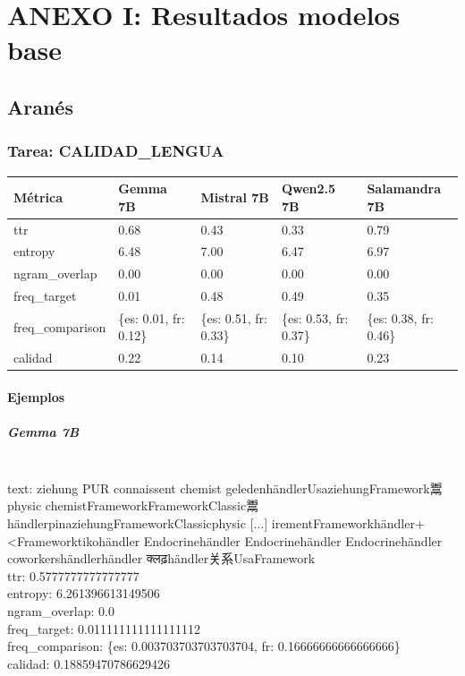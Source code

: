\chapter{ANEXO I: Resultados modelos base}

\section{Aranés}

\subsection{Tarea: CALIDAD\_LENGUA}\label{tarea-calidad_lengua}
{\def\LTcaptype{none}
\begin{longtable}[]{@{}lllll@{}}
\toprule\noalign{}
Métrica & Gemma 7B & Mistral 7B & Qwen2.5 7B & Salamandra 7B \\
\midrule\noalign{}
\endhead
\bottomrule\noalign{}
\endlastfoot
ttr & 0.68 & 0.43 & 0.33 & 0.79 \\
entropy & 6.48 & 7.00 & 6.47 & 6.97 \\
ngram\_overlap & 0.00 & 0.00 & 0.00 & 0.00 \\
freq\_target & 0.01 & 0.48 & 0.49 & 0.35 \\
freq\_comparison & \{\textquotesingle{}es\textquotesingle{}: 0.01, \textquotesingle{}fr\textquotesingle{}: 0.12\} & \{\textquotesingle{}es\textquotesingle{}: 0.51, \textquotesingle{}fr\textquotesingle{}: 0.33\} & \{\textquotesingle{}es\textquotesingle{}: 0.53, \textquotesingle{}fr\textquotesingle{}: 0.37\} & \{\textquotesingle{}es\textquotesingle{}: 0.38, \textquotesingle{}fr\textquotesingle{}: 0.46\} \\
calidad & 0.22 & 0.14 & 0.10 & 0.23 \\
\end{longtable}}

\subsubsection{Ejemplos}

\paragraph{Gemma 7B}~\\
{text:} ziehung PUR connaissent chemist geledenhändlerUsaziehungFramework鬻physic chemistFrameworkFrameworkClassic鬻händlerpinaziehungFrameworkClassicphysic [...] irementFrameworkhändler+{\textless}Frameworktikohändler Endocrinehändler Endocrinehändler Endocrinehändler coworkershändlerhändler क्लढ़händler关系UsaFramework\\
{ttr:} 0.5777777777777777\\
{entropy:} 6.261396613149506\\
{ngram\_overlap:} 0.0\\
{freq\_target:} 0.011111111111111112\\
{freq\_comparison:} \{\textquotesingle{}es\textquotesingle{}: 0.003703703703703704, \textquotesingle{}fr\textquotesingle{}: 0.16666666666666666\}\\
{calidad:} 0.18859470786629426\\

